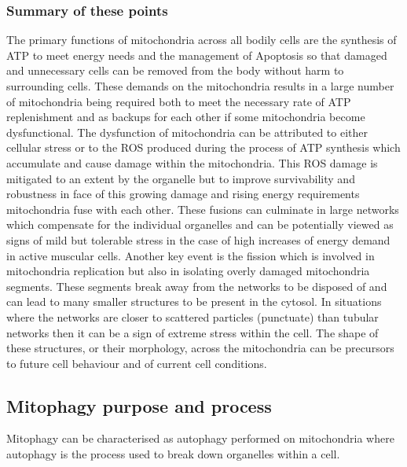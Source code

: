 \subsubsection{Summary of these points}
The primary functions of mitochondria across all bodily cells are the synthesis of ATP to meet energy needs and the management of Apoptosis so that damaged and unnecessary cells can be removed from the body without harm to surrounding cells. These demands on the mitochondria results in a large number of mitochondria being required both to meet the necessary rate of ATP replenishment and as backups for each other if some mitochondria become dysfunctional. The dysfunction of mitochondria can be attributed to either cellular stress or to the ROS produced during the process of ATP synthesis which accumulate and cause damage within the mitochondria. This ROS damage is mitigated to an extent by the organelle but to improve survivability and robustness in face of this growing damage and rising energy requirements mitochondria fuse with each other. These fusions can culminate in large networks which compensate for the individual organelles and can be potentially viewed as signs of mild but tolerable stress in the case of high increases of energy demand in active muscular cells. Another key event is the fission which is involved in mitochondria replication but also in isolating overly damaged mitochondria segments. These segments break away from the networks to be disposed of and can lead to many smaller structures to be present in the cytosol. In situations where the networks are closer to scattered particles (punctuate) than tubular networks then it can be a sign of extreme stress within the cell. The shape of these structures, or their morphology, across the mitochondria can be precursors to future cell behaviour and of current cell conditions.    
\subsection{Mitophagy purpose and process}\label{sec:Mitophage}
Mitophagy can be characterised as autophagy performed on mitochondria where autophagy is the process used to break down organelles within a cell.\cite{introPhys-2013}  
